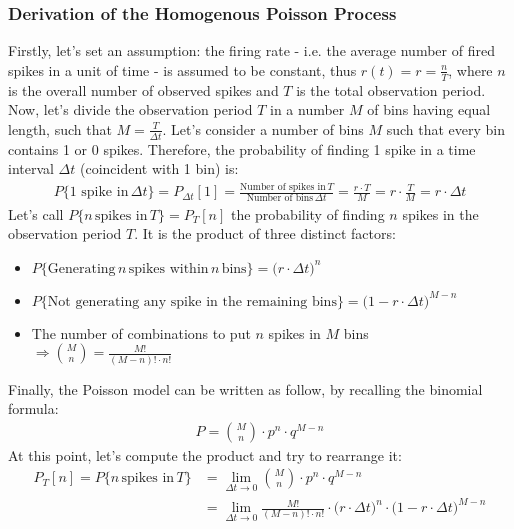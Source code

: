 \subsubsection{Derivation of the Homogenous Poisson Process}
Firstly, let's set an assumption: the firing rate - i.e. the average number
of fired spikes in a unit of time - is assumed to be constant, thus
\(r(t)=r=\frac{n}{T}\), where \(n\) is the overall number of observed spikes
and \(T\) is the total observation period.\\
Now, let's divide the observation period \(T\) in a number \(M\) of bins having
equal length, such that \(M=\frac{T}{\Delta{t}}\). Let's consider a
number of bins \(M\) such that every bin contains 1 or 0 spikes. Therefore,
the probability of finding 1 spike in a time interval \(\Delta{t}\) (coincident
with 1 bin) is:
\begin{align*}
    P\{\text{1 spike in}\,\Delta{t}\}=P_{\Delta{t}}[1]
    =\frac{\text{Number of spikes in}\,T}{\text{Number of bins}\,\Delta{t}}
    =\frac{r\cdot{T}}{M}
    =r\cdot\frac{T}{M}
    =r\cdot{\Delta{t}}
\end{align*}
Let's call \(P\{n\,\text{spikes in}\,T\}=P_T[n]\) the probability of finding \(n\)
spikes in the observation period \(T\). It is the product of three distinct factors:
\begin{itemize}
    \item \(P\{\text{Generating}\,n\,\text{spikes within}\,n\,\text{bins}\}
    =\bigl(r\cdot{\Delta{t}}\bigr)^n\)
    \item \(P\{\text{Not generating any spike in the remaining bins}\}
    =\bigl(1-r\cdot{\Delta{t}}\bigr)^{M-n}\)
    \item The number of combinations to put \(n\) spikes in \(M\) bins
    \(\Rightarrow\binom{M}{n}=\frac{M!}{(M-n)!\cdot{n!}}\)
\end{itemize}
Finally, the Poisson model can be written as follow, by recalling the binomial formula:
\begin{align*}
    P=\binom{M}{n}\cdot{p^n}\cdot{q^{M-n}}
\end{align*}
At this point, let's compute the product and try to rearrange it:
\begin{align*}
    P_T[n]=P\{n\,\text{spikes in}\,T\}
    &=\lim_{\Delta{t}\to{0}}\binom{M}{n}\cdot{p^n}\cdot{q^{M-n}}\\
    &=\lim_{\Delta{t}\to{0}}\frac{M!}{(M-n)!\cdot{n!}}\cdot{\bigl(r\cdot{\Delta{t}}\bigr)^n}\cdot{\bigl(1-r\cdot{\Delta{t}}\bigr)^{M-n}}
\end{align*}
